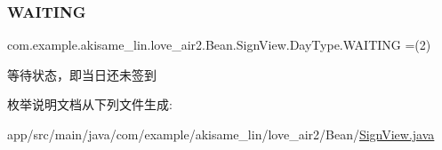 \subsubsection{\texorpdfstring{WAITING}{WAITING}}
{\footnotesize\ttfamily com.\+example.\+akisame\+\_\+lin.\+love\+\_\+air2.\+Bean.\+Sign\+View.\+Day\+Type.\+W\+A\+I\+T\+I\+NG =(2)}

等待状态，即当日还未签到 

枚举说明文档从下列文件生成\+:\begin{DoxyCompactItemize}
\item 
app/src/main/java/com/example/akisame\+\_\+lin/love\+\_\+air2/\+Bean/\mbox{\hyperlink{_sign_view_8java}{Sign\+View.\+java}}\end{DoxyCompactItemize}
